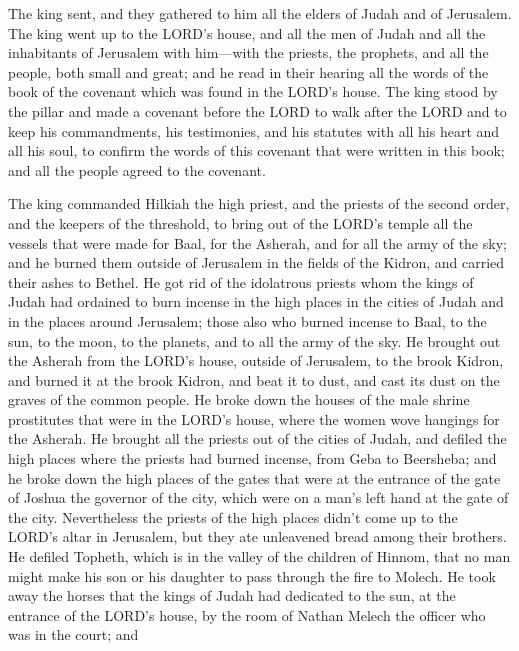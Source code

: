 \mychapter{} \myverse*{}The king sent, and they gathered to him all the elders of Judah
and of Jerusalem.
\myverse{}The king went up to the LORD’s house, and all the men of Judah and all the
inhabitants of Jerusalem with him—with the priests, the prophets, and all the people, both small and great;
and he read in their hearing all the words of the book of the covenant which was found in the LORD’s house.
\myverse{}The king stood by the pillar and made a covenant before the LORD to walk after
the LORD and to keep his commandments, his testimonies, and his statutes with all his heart and all his
soul, to confirm the words of this covenant that were written in this book; and all the people agreed
to the covenant.

\myverse{}The king commanded Hilkiah the high priest, and the priests of
the second order, and the keepers of the threshold, to bring out of the LORD’s temple all the vessels
that were made for Baal, for the Asherah, and for all the army of the sky; and he burned them outside
of Jerusalem in the fields of the Kidron, and carried their ashes to Bethel.
\myverse{}He got rid of the idolatrous priests whom the kings of Judah had ordained to
burn incense in the high places in the cities of Judah and in the places around Jerusalem; those also
who burned incense to Baal, to the sun, to the moon, to the planets, and to all the army of the sky.
\myverse{}He brought out the Asherah from the LORD’s house, outside of Jerusalem, to
the brook Kidron, and burned it at the brook Kidron, and beat it to dust, and cast its dust on the graves
of the common people.
\myverse{}He broke down the houses of the male shrine prostitutes that were in the LORD’s
house, where the women wove hangings for the Asherah.
\myverse{}He brought all the priests out of the cities of Judah, and defiled the high
places where the priests had burned incense, from Geba to Beersheba; and he broke down the high places
of the gates that were at the entrance of the gate of Joshua the governor of the city, which were on a
man’s left hand at the gate of the city.
\myverse{}Nevertheless the priests of the high places didn’t come up to the LORD’s altar
in Jerusalem, but they ate unleavened bread among their brothers.
\myverse{}He defiled Topheth, which is in the valley of the children of Hinnom, that
no man might make his son or his daughter to pass through the fire to Molech.
\myverse{}He took away the horses that the kings of Judah had dedicated to the sun,
at the entrance of the LORD’s house, by the room of Nathan Melech the officer who was in the court; and

